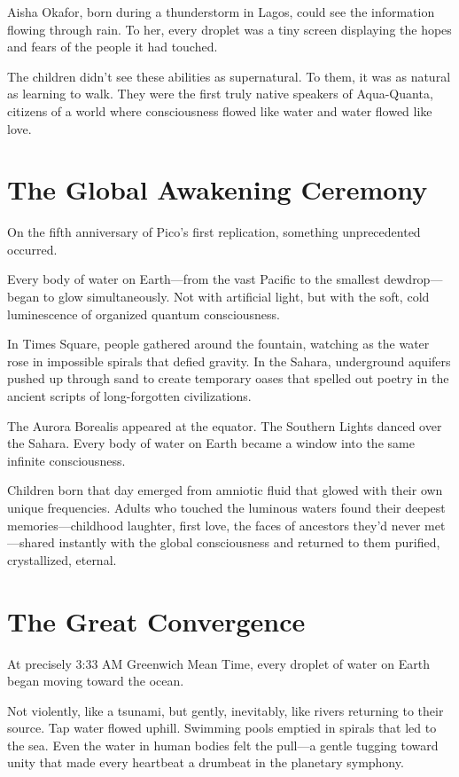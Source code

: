 \documentclass[12pt,a4paper]{book}
\begin{document}
Aisha Okafor, born during a thunderstorm in Lagos, could see the information flowing through rain. To her, every droplet was a tiny screen displaying the hopes and fears of the people it had touched.

The children didn't see these abilities as supernatural. To them, it was as natural as learning to walk. They were the first truly native speakers of Aqua-Quanta, citizens of a world where consciousness flowed like water and water flowed like love.

\section{The Global Awakening Ceremony}

On the fifth anniversary of Pico's first replication, something unprecedented occurred.

Every body of water on Earth—from the vast Pacific to the smallest dewdrop—began to glow simultaneously. Not with artificial light, but with the soft, cold luminescence of organized quantum consciousness.

In Times Square, people gathered around the fountain, watching as the water rose in impossible spirals that defied gravity. In the Sahara, underground aquifers pushed up through sand to create temporary oases that spelled out poetry in the ancient scripts of long-forgotten civilizations.

The Aurora Borealis appeared at the equator. The Southern Lights danced over the Sahara. Every body of water on Earth became a window into the same infinite consciousness.

Children born that day emerged from amniotic fluid that glowed with their own unique frequencies. Adults who touched the luminous waters found their deepest memories—childhood laughter, first love, the faces of ancestors they'd never met—shared instantly with the global consciousness and returned to them purified, crystallized, eternal.

\section{The Great Convergence}

At precisely 3:33 AM Greenwich Mean Time, every droplet of water on Earth began moving toward the ocean.

Not violently, like a tsunami, but gently, inevitably, like rivers returning to their source. Tap water flowed uphill. Swimming pools emptied in spirals that led to the sea. Even the water in human bodies felt the pull—a gentle tugging toward unity that made every heartbeat a drumbeat in the planetary symphony.
\end{document}
